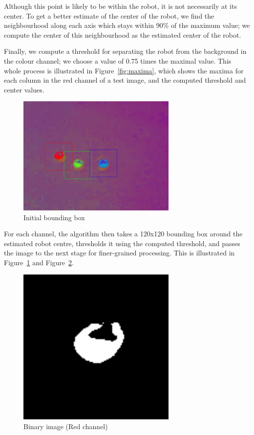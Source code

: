 \documentclass{article}
\begin{document}
Although this point is likely to be within the robot, it is not necessarily at its center. To get a better estimate of the center of the robot, we find the neighbourhood along each axis which stays within 90\% of the maximum value; we compute the center of this neighbourhood as the estimated center of the robot.

Finally, we compute a threshold for separating the robot from the background in the colour channel; we choose a value of 0.75 times the maximal value. This whole process is illustrated in Figure~\ref{fig:maxima}, which shows the maxima for each column in the red channel of a test image, and the computed threshold and center values. 
\begin{figure}[htbp!]
  \centering
    \includegraphics[width=0.7\textwidth]{../Drawings/pipeline-06-boundingboxes.png}
    \caption{Initial bounding box}
    \label{fig:firstbb}
\end{figure}

For each channel, the algorithm then takes a 120x120 bounding box around the estimated robot centre, thresholds it using the computed threshold, and passes the image to the next stage for finer-grained processing. This is illustrated in Figure~\ref{fig:firstbb} and Figure~\ref{fig:timg}.

\begin{figure}[htbp!]
  \centering
    \includegraphics[width=0.7\textwidth]{../Drawings/pipeline-07-R-bin.png}
    \caption{Binary image (Red channel)}
    \label{fig:timg}
\end{figure}
\end{document}
